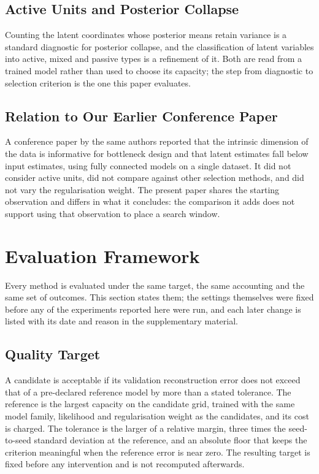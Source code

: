 \documentclass[make,article,submit,pdftex,moreauthors]{Definitions/mdpi}
\begin{document}
\subsection{Active Units and Posterior Collapse}\label{sec:rel_au}

Counting the latent coordinates whose posterior means retain variance is a
standard diagnostic for posterior collapse, and the classification of
latent variables into active, mixed and passive types is a refinement of
it. Both are read from a trained model rather than used to choose its
capacity; the step from diagnostic to selection criterion is the one this
paper evaluates.

\subsection{Relation to Our Earlier Conference Paper}\label{sec:rel_nolta}

A conference paper by the same authors reported that the intrinsic
dimension of the data is informative for bottleneck design and that latent
estimates fall below input estimates, using fully connected models on a
single dataset. It did not consider active units, did not compare against
other selection methods, and did not vary the regularisation weight. The
present paper shares the starting observation and differs in what it
concludes: the comparison it adds does not support using that observation
to place a search window.


\section{Evaluation Framework}\label{sec:framework}

Every method is evaluated under the same target, the same accounting and
the same set of outcomes. This section states them; the settings
themselves were fixed before any of the experiments reported here were
run, and each later change is listed with its date and reason in the
supplementary material.

\subsection{Quality Target}\label{sec:framework_quality}

A candidate is acceptable if its validation reconstruction error does not
exceed that of a pre-declared reference model by more than a stated
tolerance. The reference is the largest capacity on the candidate grid,
trained with the same model family, likelihood and regularisation weight
as the candidates, and its cost is charged. The tolerance is the larger of
a relative margin, three times the seed-to-seed standard deviation at the
reference, and an absolute floor that keeps the criterion meaningful when
the reference error is near zero. The resulting target is fixed before any
intervention and is not recomputed afterwards.
\end{document}
